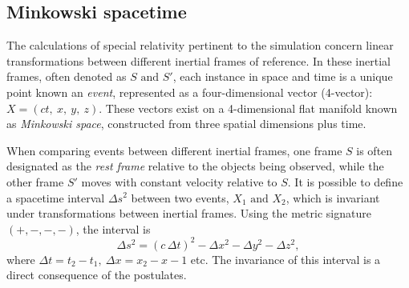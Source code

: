 \documentclass[a4paper]{article}
\begin{document}
\subsection{Minkowski spacetime}
The calculations of special relativity pertinent to the simulation concern linear transformations between different inertial frames of reference. In these inertial frames, often denoted as \(S \text{ and } S'\), each instance in space and time is a unique point known an \textit{event}, represented as a four-dimensional vector (4-vector): $X = (ct,\  x,\ y,\ z)$. These vectors exist on a 4-dimensional flat manifold known as \textit{Minkowski space}, constructed from three spatial dimensions plus time.

When comparing events between different inertial frames, one frame $S$ is often designated as the \textit{rest frame} relative to the objects being observed, while the other frame $S'$ moves with constant velocity relative to $S$. It is possible to define a spacetime interval $\Delta s^2$ between two events, \(X_1 \text{ and } X_2\), which is invariant under transformations between inertial frames. Using the metric signature \((+,-,-,-)\), the interval is
\begin{equation}
    \Delta s^2 = (c\,\Delta t)^2 - \Delta x^2 - \Delta y^2 - \Delta z^2, \label{interval}
\end{equation}
where $\Delta t = t_2 - t_1,\ \Delta x = x_2 - x-1$ etc. The invariance of this interval is a direct consequence of the postulates.
\end{document}
